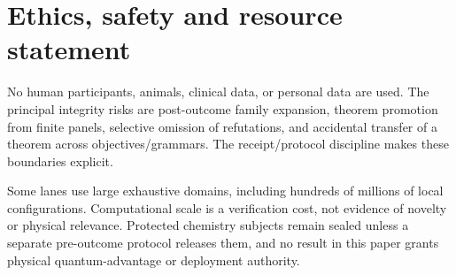 \section{Ethics, safety and resource statement}

No human participants, animals, clinical data, or personal data are used. The principal integrity risks are post-outcome family expansion, theorem promotion from finite panels, selective omission of refutations, and accidental transfer of a theorem across objectives/grammars. The receipt/protocol discipline makes these boundaries explicit.

Some lanes use large exhaustive domains, including hundreds of millions of local configurations. Computational scale is a verification cost, not evidence of novelty or physical relevance. Protected chemistry subjects remain sealed unless a separate pre-outcome protocol releases them, and no result in this paper grants physical quantum-advantage or deployment authority.